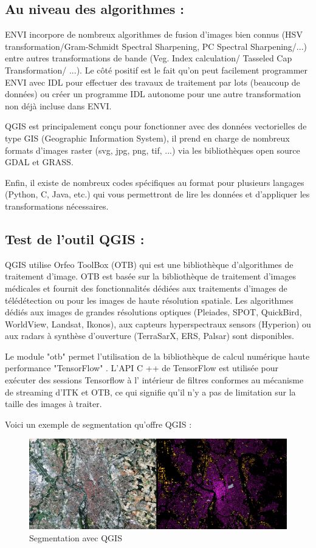 \documentclass[12pt, openany]{report}
\begin{document}
\subsection{Au niveau des algorithmes :}


ENVI incorpore de nombreux algorithmes de fusion d'images bien connus (HSV transformation/Gram-Schmidt Spectral Sharpening, PC Spectral Sharpening/...) entre autres transformations de bande (Veg. Index calculation/ Tasseled Cap Transformation/ ...). Le côté positif est le fait qu'on peut facilement programmer ENVI avec IDL pour effectuer des travaux de traitement par lots (beaucoup de données) ou créer un programme IDL autonome pour une autre transformation non déjà incluse dans ENVI.\cite{re12}

QGIS est principalement conçu pour fonctionner avec des données vectorielles de type GIS (Geographic Information System), il prend en charge de nombreux formats d'images raster (svg, jpg, png, tif, ...) via les bibliothèques open source GDAL et GRASS.

Enfin, il existe de nombreux codes spécifiques au format pour plusieurs langages (Python, C, Java, etc.) qui vous permettront de lire les données et d'appliquer les transformations nécessaires.

\subsection{Test de l'outil QGIS :}
QGIS utilise Orfeo ToolBox (OTB) qui est une bibliothèque d’algorithmes de traitement d’image. OTB est basée sur la bibliothèque de traitement d’images médicales et fournit des fonctionnalités dédiées aux traitements d’images de télédétection ou pour les images de haute résolution spatiale. Les algorithmes dédiés aux images de grandes résolutions optiques (Pleiades, SPOT, QuickBird, WorldView, Landsat, Ikonos), aux capteurs hyperspectraux sensors (Hyperion) ou aux radars à synthèse d’ouverture (TerraSarX, ERS, Palsar) sont disponibles.\cite{ref12}

Le module "otb" permet l'utilisation de la bibliothèque de calcul numérique haute performance "TensorFlow" . L'API C ++ de TensorFlow est utilisée pour exécuter des sessions Tensorflow à l' intérieur de filtres conformes au mécanisme de streaming d'ITK et OTB, ce qui signifie qu'il n'y a pas de limitation sur la taille des images à traiter.\cite{ref13}


Voici un exemple de segmentation qu'offre QGIS :
\begin{figure}[H]
\centering
\noindent
\includegraphics[width=1\textwidth]{test_segmentation.png}
\caption{Segmentation avec QGIS}
\end{figure}
\end{document}
